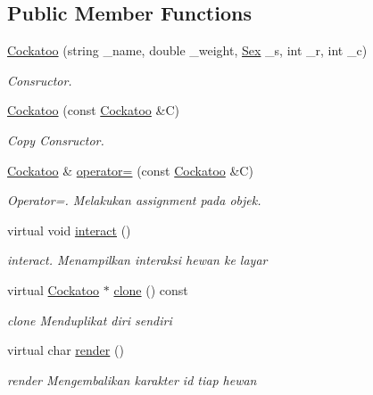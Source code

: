 \subsection*{Public Member Functions}
\begin{DoxyCompactItemize}
\item 
\hyperlink{classCockatoo_a5838e2eb3136afc17f69310d4c8abadc}{Cockatoo} (string \+\_\+name, double \+\_\+weight, \hyperlink{sex_8h_a2633cb393c68bb2ee8080db58fb7ba93}{Sex} \+\_\+s, int \+\_\+r, int \+\_\+c)
\begin{DoxyCompactList}\small\item\em Consructor. \end{DoxyCompactList}\item 
\hyperlink{classCockatoo_a4188365bf70f793bdeb7cca7c5405e74}{Cockatoo} (const \hyperlink{classCockatoo}{Cockatoo} \&C)
\begin{DoxyCompactList}\small\item\em Copy Consructor. \end{DoxyCompactList}\item 
\hyperlink{classCockatoo}{Cockatoo} \& \hyperlink{classCockatoo_a88f2d3fa9d377a7b6dc36172e289e0ee}{operator=} (const \hyperlink{classCockatoo}{Cockatoo} \&C)
\begin{DoxyCompactList}\small\item\em Operator=. Melakukan assignment pada objek. \end{DoxyCompactList}\item 
virtual void \hyperlink{classCockatoo_ab202d8b4fa4cafe364618a2e8c2e60ea}{interact} ()
\begin{DoxyCompactList}\small\item\em interact. Menampilkan interaksi hewan ke layar \end{DoxyCompactList}\item 
virtual \hyperlink{classCockatoo}{Cockatoo} $\ast$ \hyperlink{classCockatoo_ad679253fde6f461fa49011583d113d48}{clone} () const 
\begin{DoxyCompactList}\small\item\em clone Menduplikat diri sendiri \end{DoxyCompactList}\item 
virtual char \hyperlink{classCockatoo_af124198ac79414cd16e78ee673191585}{render} ()
\begin{DoxyCompactList}\small\item\em render Mengembalikan karakter id tiap hewan \end{DoxyCompactList}\item 

\end{DoxyCompactItemize}
